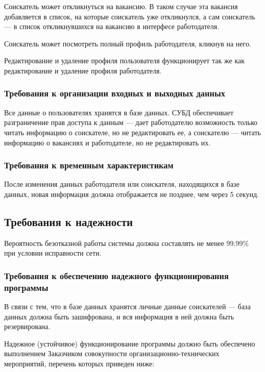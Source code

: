 \documentclass[a4page]{article}
\begin{document}
Соискатель может откликнуться на вакансию. В таком случае эта вакансия добавляется в список, на которые соискатель уже откликнулся, а сам соискатель --- в список откликнувшихся на вакансию в интерфесе работодателя.

Соискатель может посмотреть полный профиль работодателя, кликнув на него.

Редактирование и удаление профиля пользователя функционирует так же как редактирование и удаление профиля работодателя.

\subsubsection{Требования к организации входных и выходных данных}

Все данные о пользователях хранятся в базе данных. СУБД обеспечивает разграничение прав доступа к данным --- дает работодателю возможность только читать информацию о соискателе, но не редактировать ее, а соискателю --- читать информацию о вакансиях и работодателе, но не редактировать их.

\subsubsection{Требования к временным характеристикам}

После изменения данных работодателя или соискателя, находящихся в базе данных, новая информация должна отображается не позднее, чем через 5 секунд.

\subsection{Требования к надежности}

Вероятность безотказной работы системы должна составлять не менее 99.99\% при условии исправности сети.

\subsubsection{Требования к обеспечению надежного функционирования программы}

В связи с тем, что в базе данных хранятся личные данные соискателей --- база данных должна быть зашифрована, и вся информация в ней должна быть резервирована.

Надежное (устойчивое) функционирование программы должно быть обеспечено выполнением Заказчиком совокупности организационно-технических мероприятий, перечень которых приведен ниже:
\end{document}
